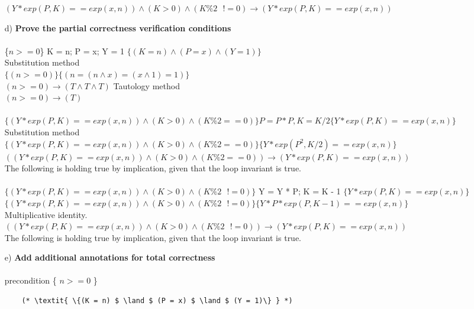 \documentclass[a4paper]{article}
\begin{document}
\begin{itemize}
    $ (Y * exp(P,K) == exp(x,n)) \land (K > 0) \land (K \% 2 \text{ } != 0) \rightarrow (Y * exp(P,K) == exp(x,n)) $\\
    \newpage
    \item[d)] \textbf{Prove the partial correctness verification conditions} \\\\
    \{$ n >= 0 $\} K = n; P = x; Y = 1 $ \{(K = n) \land (P = x) \land (Y = 1)\} $\\
    Substitution method \\
    $ \{(n >= 0)\} \{(n = (n \land x) = (x \land 1) = 1)\} $ \\
    $ (n >= 0) \rightarrow (T \land T \land T) $
    Tautology method \\
    $ (n >= 0) \rightarrow (T) $ \\\\
    $ \{ (Y * exp(P,K) == exp(x,n)) \land (K > 0) \land (K \% 2 == 0)\} P = P * P, K = K / 2 \{Y * exp(P,K) == exp(x,n)\} $ \\
    Substitution method \\
    $\{ (Y * exp(P,K) == exp(x,n)) \land (K > 0) \land (K \% 2 == 0)\} \{Y * exp(P^2,K/2) == exp(x,n)\}$ \\
    $((Y * exp(P,K) == exp(x,n)) \land (K > 0) \land (K \% 2 == 0)) \rightarrow (Y * exp(P,K) == exp(x,n)) $ \\
    The following is holding true by implication, given that the loop invariant is true. \\\\
    $\{ (Y * exp(P,K) == exp(x,n)) \land (K > 0) \land (K \% 2 \text{ } != 0)\} $ Y = Y * P; K = K - 1 $ \{Y * exp(P,K) == exp(x,n)\} $ \\
    $\{ (Y * exp(P,K) == exp(x,n)) \land (K > 0) \land (K \% 2 \text{ } != 0)\} \{Y * P * exp(P,K-1) == exp(x,n)\} $ \\
    Multiplicative identity. \\
    $((Y * exp(P,K) == exp(x,n)) \land (K > 0) \land (K \% 2 \text{ } != 0)) \rightarrow (Y * exp(P,K) == exp(x,n)) $ \\
    The following is holding true by implication, given that the loop invariant is true.
    \item[e)] \textbf{Add additional annotations for total correctness} \\\\
    precondition \{ $ n >= 0 $ \}
    \begin{lstlisting}
    (* \textit{ \{(K = n) $ \land $ (P = x) $ \land $ (Y = 1)\} } *)

\end{lstlisting}
\end{itemize}
\end{document}
